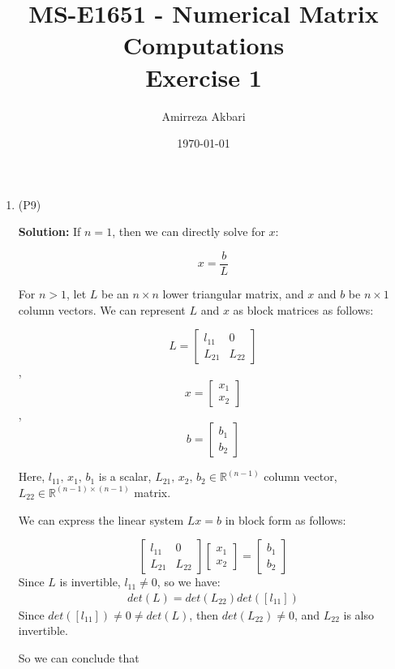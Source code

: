 \documentclass[12pt]{article}
\title{MS-E1651 - Numerical Matrix Computations
\\Exercise 1}
\author{Amirreza Akbari}
\date{\today}
\begin{document}
\maketitle
\begin{enumerate}[leftmargin=\labelsep]
	\item (P9) 
    
    \textbf{Solution:} 
	If \(n = 1\), then we can directly solve for \(x\):

\[
x = \frac{b}{L}
\]
	
For $n > 1$, let \(L\) be an \(n \times n\) lower triangular matrix, and \(x\) and \(b\) be \(n \times 1\) column vectors. We can represent \(L\) and \(x\) as block matrices as follows:

\[
L = \begin{bmatrix}
    l_{11} & 0 \\
    L_{21} & L_{22}
\end{bmatrix}
\], \[
x = \begin{bmatrix}
    x_{1} \\
    x_{2}
\end{bmatrix}
\], \[
b = \begin{bmatrix}
    b_{1} \\
    b_{2}
\end{bmatrix}
\]

Here, \(l_{11},\,x_1,\,b_1\) is a scalar, \(L_{21},\,x_{2},\,b_{2} \in \mathbb{R}^{(n-1)}\) column vector, \(L_{22} \in \mathbb{R}^{(n-1) \times (n-1)}\) matrix.

We can express the linear system \(Lx = b\) in block form as follows:

\[
\begin{bmatrix}
    l_{11} & 0 \\
    L_{21} & L_{22}
\end{bmatrix}
\begin{bmatrix}
    x_{1} \\
    x_{2}
\end{bmatrix}
=
\begin{bmatrix}
    b_{1} \\
    b_{2}
\end{bmatrix}
\]
Since $L$ is invertible, $l_{11} \neq 0$, so we have:
\begin{align*}
det(L) = det(L_{22})det([l_{11}])
\end{align*}
Since $det([l_{11}])\neq 0 \neq det(L)$, then $det(L_{22}) \neq 0$, and $L_{22}$ is also invertible.

So we can conclude that 


\end{enumerate}
\end{document}

